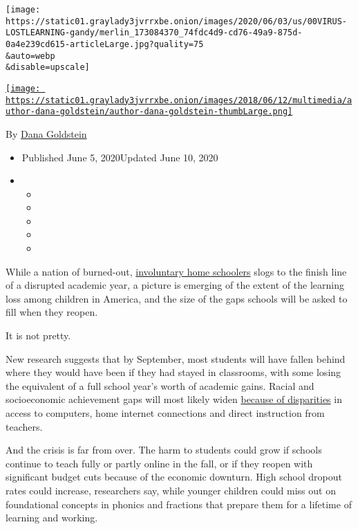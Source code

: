 \texttt{[image: https://static01.graylady3jvrrxbe.onion/images/2020/06/03/us/00VIRUS-LOSTLEARNING-gandy/merlin\_173084370\_74fdc4d9-cd76-49a9-875d-0a4e239cd615-articleLarge.jpg?quality=75\\\&auto=webp\\\&disable=upscale]}

\href{https://www.nytimes3xbfgragh.onion/by/dana-goldstein}{\texttt{[image: https://static01.graylady3jvrrxbe.onion/images/2018/06/12/multimedia/author-dana-goldstein/author-dana-goldstein-thumbLarge.png]}}

By \href{https://www.nytimes3xbfgragh.onion/by/dana-goldstein}{Dana
Goldstein}

\begin{itemize}
\item
  Published June 5, 2020Updated June 10, 2020
\item
  \begin{itemize}
  \item
  \item
  \item
  \item
  \item
  \end{itemize}
\end{itemize}

While a nation of burned-out,
\href{https://www.nytimes3xbfgragh.onion/2020/04/06/us/coronavirus-schools-attendance-absent.html}{involuntary
home schoolers} slogs to the finish line of a disrupted academic year, a
picture is emerging of the extent of the learning loss among children in
America, and the size of the gaps schools will be asked to fill when
they reopen.

It is not pretty.

New research suggests that by September, most students will have fallen
behind where they would have been if they had stayed in classrooms, with
some losing the equivalent of a full school year's worth of academic
gains. Racial and socioeconomic achievement gaps will most likely widen
\href{https://www.nytimes3xbfgragh.onion/2020/05/09/us/coronavirus-public-private-school.html}{because
of disparities} in access to computers, home internet connections and
direct instruction from teachers.

And the crisis is far from over. The harm to students could grow if
schools continue to teach fully or partly online in the fall, or if they
reopen with significant budget cuts because of the economic downturn.
High school dropout rates could increase, researchers say, while younger
children could miss out on foundational concepts in phonics and
fractions that prepare them for a lifetime of learning and working.

